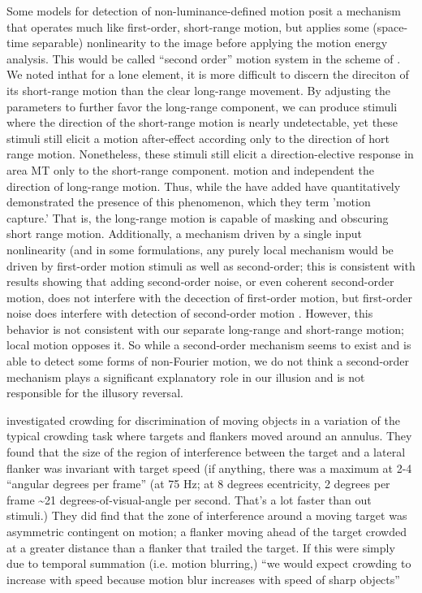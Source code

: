 \documentclass[english,jou]{article}
\begin{document}
Some models for detection of non-luminance-defined motion posit a
mechanism that operates much like first-order, short-range motion,
but applies some (space-time separable) nonlinearity to the image
before applying the motion energy analysis. This would be called ``second
order'' motion system in the scheme of \citet{Lu:1995la}. We noted
inthat for a lone element, it is more difficult
to discern the direciton of its short-range motion than the clear
long-range movement. By adjusting the parameters to further favor
the long-range component, we can produce stimuli where the direction
of the short-range motion is nearly undetectable, yet these stimuli
still elicit a motion after-effect according only to the direction
of hort range motion. Nonetheless, these stimuli still elicit a direction-elective
response in area MT only to the short-range component\citep{Shadlen:1993ne}.
motion and independent the direction of long-range motion. Thus, while
the have added  have quantitatively demonstrated the presence of
this phenomenon, which they term 'motion capture.' That is, the long-range
motion is capable of masking and obscuring short range motion. Additionally,
a mechanism driven by a single input nonlinearity (and in some formulations,
any purely local mechanism \citep{Zanker:1993uq} would be driven
by first-order motion stimuli as well as second-order;  this is consistent
with results showing that adding second-order noise, or even coherent
second-order motion, does not interfere with the decection of first-order
motion, but first-order noise does interfere with detection of second-order
motion \citep{Edwards:1995fk,Cassanello:2011uq}. However, this behavior
is not consistent with our separate long-range and short-range motion;
local motion opposes it. So while a second-order mechanism seems to
exist and is able to detect some forms of non-Fourier motion, we do
not think a second-order mechanism plays a significant explanatory
role in our illusion and is not responsible for the illusory reversal.





\citet{Bex:2003ix}investigated crowding for discrimination of moving
objects in a variation of the typical crowding task where targets
and flankers moved around an annulus. They found that the size of
the region of interference between the target and a lateral flanker
was invariant with target speed (if anything, there was a maximum
at 2-4 ``angular degrees per frame'' (at 75 Hz; at 8 degrees ecentricity,
2 degrees per frame \textasciitilde{}21 degrees-of-visual-angle per
second. That's a lot faster than out stimuli.) They did find that
the zone of interference around a moving target was asymmetric contingent
on motion; a flanker moving ahead of the target crowded at a greater
distance than a flanker that trailed the target. If this were simply
due to temporal summation (i.e. motion blurring,) ``we would expect
crowding to increase with speed because motion blur increases with
speed of sharp objects'' 
\end{document}
